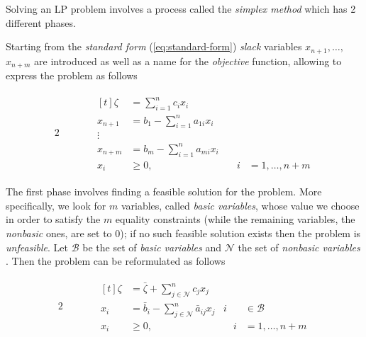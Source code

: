 Solving an \acrshort{LP} problem involves a process called the \emph{simplex
	method} which has 2 different phases.

Starting from the \emph{standard form} (\autoref{eq:standard-form})
\emph{slack} variables $x_{n+1}, \dots, $ $x_{n+m} $ are introduced as well as a name
for the \emph{objective} function, allowing to express the problem as follows
\cite{Vanderbei2008}\cite{Edgar2001}

\begin{alignat}{2}
	\label{eq:standard-form}
	 &  & \quad &
	\begin{aligned}[t]
		\zeta   & = \sum_{i=1}^{n} c_{i}x_{i}                                       \\
		x_{n+1} & = b_{1} - \sum_{i=1}^{n} a_{1i}  x_{i} &                          \\
		\vdots                                                                      \\
		x_{n+m} & = b_{m} - \sum_{i=1}^{n} a_{mi}  x_{i} &                          \\
		x_{i}   & \geq 0,                                & \quad i & =1 ,\dots, n+m
	\end{aligned}
\end{alignat}

The first phase involves finding a feasible solution for the problem. More
specifically, we look for $m$ variables, called \emph{basic variables}, whose
value we choose in order to satisfy the $m$ equality constraints (while the
remaining variables, the \emph{nonbasic} ones, are set to 0); if no such
feasible solution exists then the problem is \emph{unfeasible}. Let $\mathcal{B}
$ be the set of \emph{basic variables} and $\mathcal{N} $ the set of
\emph{nonbasic variables} \cite{Vanderbei2008}\cite{Bertsimas1997}. Then the
problem can be reformulated as follows

\begin{alignat}{2}
	\label{eq:standard-form-simplex-new}
	 &  & \quad &
	\begin{aligned}[t]
		\zeta & = \bar{\zeta} + \sum_{j \in \mathcal{N} }^{n} c_{j}x_{j}                                      \\
		x_{i} & = \bar{b}_{i} - \sum_{j \in \mathcal{N} }^{n} \bar{a}_{ij}
		x_{j} & i                                                          & \in \mathcal{B}                  \\
		x_{i} & \geq 0,                                                    & \quad i         & =1 ,\dots, n+m
	\end{aligned}
\end{alignat}


